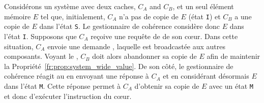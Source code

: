 \begin{example}%
\label{fr:ex:general_msi_single_store}
Considérons un système avec deux caches,
$C_A$ and $C_B$, et un seul élément mémoire $E$ tel que, initialement,
$C_A$ n'a pas de copie de $E$ (état \texttt{I}) et $C_B$ a une copie de $E$
dans l'état \texttt{S}. Le gestionnaire de cohérence considère donc $E$
dans l'état \texttt{I}.
Supposons que $C_A$ reçoive une requête de \storeinstr{} de son c\oe ur. Dans cette situation,
$C_A$ envoie une demande \getmquery{}, laquelle est broadcastée aux autres composants.
Voyant le \getmquery{}, $C_B$ doit alors abandonner sa copie de $E$ afin
de maintenir la Propriété~\ref{fr:prop:system_wide_value}.
De son côté, le gestionnaire de cohérence
réagit au \getmquery{} en envoyant une réponse \simpledata{} à $C_A$ et en
considérant désormais $E$ dans l'état \texttt{M}. Cette réponse
\simpledata{} permet à $C_A$ d'obtenir sa copie de $E$ avec un état \texttt{M}
et donc d'exécuter l'instruction du c\oe ur.
\end{example}




